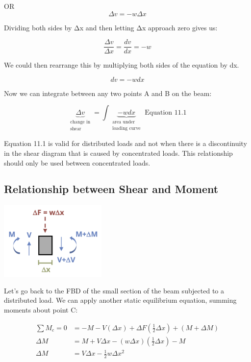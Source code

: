 \documentclass[
  letterpaper,
  DIV=11,
  numbers=noendperiod]{scrreprt}
\begin{document}
OR \[
\Delta v=-w \Delta x
\]

Dividing both sides by Δx and then letting Δx approach zero gives us:

\[
\frac{\Delta v}{\Delta x}=\frac{d v}{d x}=-w
\]

We could then rearrange this by multiplying both sides of the equation
by dx.

\[
d v=-w d x
\]

Now we can integrate between any two points A and B on the beam:

\[
\underbrace{\Delta v}_{\substack{\text{change in} \\ \text{shear}}}=\int\underbrace{-w d x}_{\substack{\text{area under} \\ \text {loading curve}}} \text{ Equation 11.1}
\]

Equation 11.1 is valid for distributed loads and not when there is a
discontinuity in the shear diagram that is caused by concentrated loads.
This relationship should only be used between concentrated loads.

\subsection{Relationship between Shear and
Moment}\label{relationship-between-shear-and-moment}

\begin{center}
\includegraphics[width=2.07292in,height=\textheight]{images/CH7 PNGs/figure 7.5.png}
\end{center}

Let's go back to the FBD of the small section of the beam subjected to a
distributed load. We can apply another static equilibrium equation,
summing moments about point C:

\[
\begin{aligned}
\sum M_c=0 & =-M-V(\Delta x)+\Delta F\left(\frac{1}{2} \Delta x\right)+(M+\Delta M) \\
\Delta M & =M+V \Delta x-(w \Delta x)\left(\frac{1}{2} \Delta x\right)-M \\
\Delta M & =V \Delta x-\frac{1}{2} w \Delta x^2
\end{aligned}
\]
\end{document}

